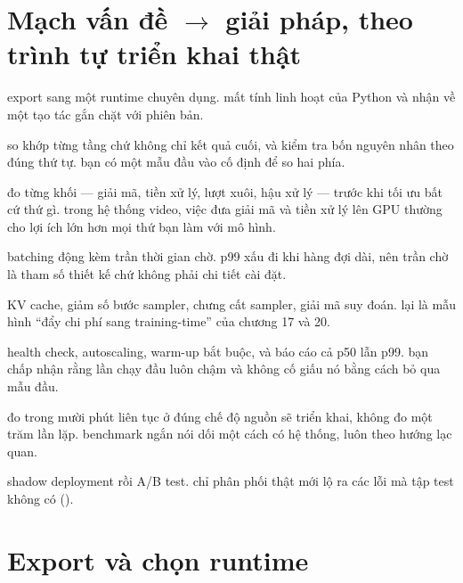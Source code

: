 \documentclass[../../deep_learning.tex]{subfiles}
\begin{document}
\section{Mạch vấn đề \(\rightarrow\) giải pháp, theo trình tự triển khai thật}

\begin{mach}
\item {} \gp export sang một runtime chuyên dụng. \gia mất tính linh hoạt của Python và nhận về một tạo tác gắn chặt với phiên bản.
\item {} \gp so khớp từng tầng chứ không chỉ kết quả cuối, và kiểm tra bốn nguyên nhân theo đúng thứ tự. \gd bạn có một mẫu đầu vào cố định để so hai phía.
\item {} \gp đo từng khối --- giải mã, tiền xử lý, lượt xuôi, hậu xử lý --- trước khi tối ưu bất cứ thứ gì. \hq trong hệ thống video, việc đưa giải mã và tiền xử lý lên GPU thường cho lợi ích lớn hơn mọi thứ bạn làm với mô hình.
\item {} \gp batching động kèm trần thời gian chờ. \gia p99 xấu đi khi hàng đợi dài, nên trần chờ là tham số thiết kế chứ không phải chi tiết cài đặt.
\item {} \gp KV cache, giảm số bước sampler, chưng cất sampler, giải mã suy đoán. \hq lại là mẫu hình ``đẩy chi phí sang training-time'' của chương 17 và 20.
\item {} \gp health check, autoscaling, warm-up bắt buộc, và báo cáo cả p50 lẫn p99. \gd bạn chấp nhận rằng lần chạy đầu luôn chậm và không cố giấu nó bằng cách bỏ qua mẫu đầu.
\item {} \gp đo trong mười phút liên tục ở đúng chế độ nguồn sẽ triển khai, không đo một trăm lần lặp. \hq benchmark ngắn nói dối một cách có hệ thống, luôn theo hướng lạc quan.
\item {} \gp shadow deployment rồi A/B test. \gd chỉ phân phối thật mới lộ ra các lỗi mà tập test không có ().
\end{mach}

\section{Export và chọn runtime}
\end{document}

